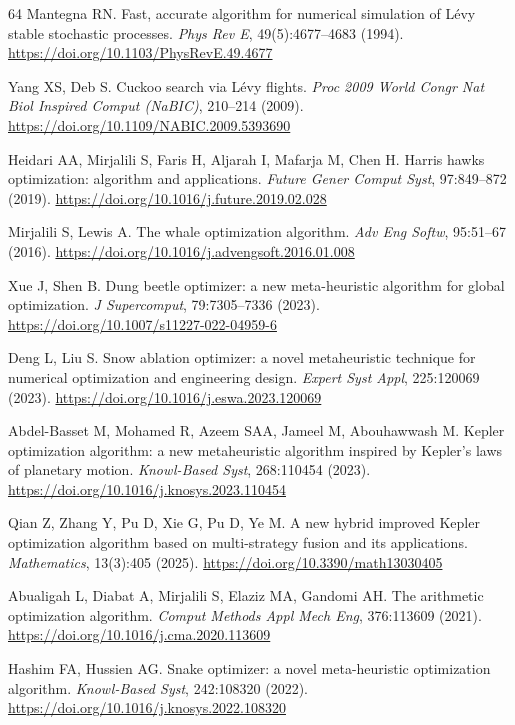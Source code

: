 \documentclass[pdflatex,onecolumn,sn-mathphys-num]{sn-jnl}
\begin{document}
\begin{thebibliography}{64}
Mantegna RN. Fast, accurate algorithm for numerical simulation of L\'{e}vy stable stochastic processes. \textit{Phys Rev E}, 49(5):4677--4683 (1994). \url{https://doi.org/10.1103/PhysRevE.49.4677}

Yang XS, Deb S. Cuckoo search via L\'{e}vy flights. \textit{Proc 2009 World Congr Nat Biol Inspired Comput (NaBIC)}, 210--214 (2009). \url{https://doi.org/10.1109/NABIC.2009.5393690}

Heidari AA, Mirjalili S, Faris H, Aljarah I, Mafarja M, Chen H. Harris hawks optimization: algorithm and applications. \textit{Future Gener Comput Syst}, 97:849--872 (2019). \url{https://doi.org/10.1016/j.future.2019.02.028}

Mirjalili S, Lewis A. The whale optimization algorithm. \textit{Adv Eng Softw}, 95:51--67 (2016). \url{https://doi.org/10.1016/j.advengsoft.2016.01.008}

Xue J, Shen B. Dung beetle optimizer: a new meta-heuristic algorithm for global optimization. \textit{J Supercomput}, 79:7305--7336 (2023). \url{https://doi.org/10.1007/s11227-022-04959-6}

Deng L, Liu S. Snow ablation optimizer: a novel metaheuristic technique for numerical optimization and engineering design. \textit{Expert Syst Appl}, 225:120069 (2023). \url{https://doi.org/10.1016/j.eswa.2023.120069}

Abdel-Basset M, Mohamed R, Azeem SAA, Jameel M, Abouhawwash M. Kepler optimization algorithm: a new metaheuristic algorithm inspired by Kepler's laws of planetary motion. \textit{Knowl-Based Syst}, 268:110454 (2023). \url{https://doi.org/10.1016/j.knosys.2023.110454}

Qian Z, Zhang Y, Pu D, Xie G, Pu D, Ye M. A new hybrid improved Kepler optimization algorithm based on multi-strategy fusion and its applications. \textit{Mathematics}, 13(3):405 (2025). \url{https://doi.org/10.3390/math13030405}

Abualigah L, Diabat A, Mirjalili S, Elaziz MA, Gandomi AH. The arithmetic optimization algorithm. \textit{Comput Methods Appl Mech Eng}, 376:113609 (2021). \url{https://doi.org/10.1016/j.cma.2020.113609}

Hashim FA, Hussien AG. Snake optimizer: a novel meta-heuristic optimization algorithm. \textit{Knowl-Based Syst}, 242:108320 (2022). \url{https://doi.org/10.1016/j.knosys.2022.108320}


\end{thebibliography}
\end{document}
